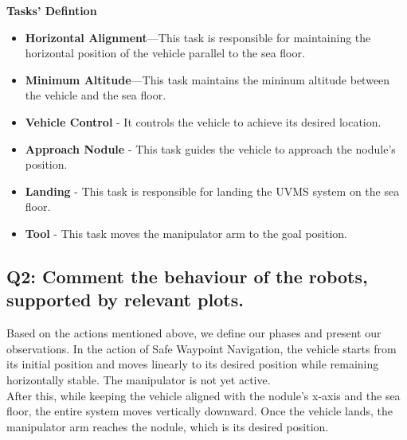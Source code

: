 \documentclass{article}
\begin{document}
\noindent
\textbf{Tasks' Defintion}
\begin{itemize}
	\item \textbf{Horizontal Alignment}—This task is responsible for maintaining the horizontal position of the vehicle parallel to the sea floor.
	\item \textbf{Minimum Altitude}—This task maintains the  mininum altitude between the vehicle and the sea floor.
	\item \textbf{Vehicle Control} - It controls the vehicle to achieve its desired location.
	\item \textbf{Approach Nodule} - This task guides the vehicle to approach the nodule's position. 
	\item \textbf{Landing} - This task is responsible for landing the UVMS system on the sea floor. 
	\item \textbf{Tool } - This task moves the manipulator arm to the goal position.
	
\end{itemize}
\clearpage


\subsection{Q2: Comment the behaviour of the robots, supported by relevant plots.}
Based on the actions mentioned above, we define our phases and present our observations.
In the action of Safe Waypoint Navigation, the vehicle starts from its initial position and moves linearly to its desired position while remaining horizontally stable. The manipulator is not yet active.
\\
After this, while keeping the vehicle aligned with the nodule's x-axis and the sea floor, the entire system moves vertically downward. Once the vehicle lands, the manipulator arm reaches the nodule, which is its desired position.
\end{document}
